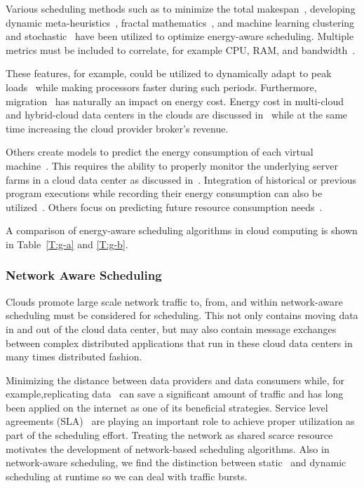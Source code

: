 \documentclass[final,5p,times,twocolumn]{elsarticle}
\begin{document}
Various scheduling methods such as to minimize the total makespan~\cite{bessis2013using}, developing dynamic meta-heuristics~\cite{bi2017application}, fractal mathematics~\cite{duan2016energy}, and machine learning clustering and stochastic~\cite{bui2017energy} have been utilized to optimize energy-aware scheduling. Multiple metrics must be included to correlate, for example CPU, RAM, and bandwidth~\cite{zhu2017three}.

These features, for example, could be utilized to dynamically adapt to peak loads~\cite{duan2016energy} while making processors faster during such periods. Furthermore, migration~\cite{beloglazov2010energy} has naturally an impact on energy cost. Energy cost in multi-cloud and hybrid-cloud data centers in the clouds are discussed in~\cite{quarati2013hybrid,garg2011environment,gai2016dynamic,dabbagh2015energy} while at the same time increasing the cloud provider broker’s revenue.


Others create models to predict the energy consumption of each virtual machine~\cite{kim2014energy}. This requires the ability to properly monitor the underlying server farms in a cloud data center as discussed in~\cite{van2012comparison}. Integration of historical or previous program executions while recording their energy consumption can also be utilized~\cite{hu2010scheduling}. Others focus on predicting future resource consumption needs~\cite{dabbagh2015energy}.

A comparison of energy-aware scheduling algorithms in cloud computing is shown in Table~\ref{T:g-a} and \ref{T:g-b}.



%

\subsubsection{Network Aware Scheduling}\label{sec:network}


Clouds promote large scale network traffic to, from, and within network-aware scheduling must be considered for scheduling. This not only contains moving data in and out of the cloud data center, but may also contain message exchanges between complex distributed applications that run in these cloud data centers in many times distributed fashion.

Minimizing the distance between data providers and data consumers while, for example,replicating data~\cite{www-akamai} can save a significant amount of traffic and has long been applied on the internet as one of its beneficial strategies. Service level agreements (SLA)~\cite{breitgand2012improving} are playing an important role to achieve proper utilization as part of the scheduling effort. Treating the network as shared scarce resource~\cite{rampersaud2016sharing} motivates the development of network-based scheduling algorithms. Also in network-aware scheduling, we find the distinction between static~\cite{biran2012stable} and dynamic scheduling at runtime so we can deal with traffic bursts.
\end{document}
